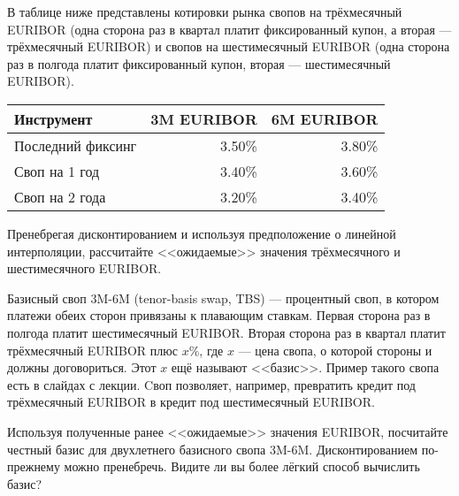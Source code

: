 \documentclass[a4paper,14pt]{extarticle}
\begin{document}
В таблице ниже представлены котировки рынка свопов на трёхмесячный EURIBOR (одна
сторона раз в квартал платит фиксированный купон, а вторая --- трёхмесячный 
EURIBOR) и свопов на шестимесячный EURIBOR (одна сторона раз в полгода платит 
фиксированный купон, вторая --- шестимесячный EURIBOR).

\begin{table}[h]
\centering
\begin{tabular}{l|r|r}
Инструмент         & 3M EURIBOR & 6M EURIBOR \\ \hline
Последний фиксинг  & 3.50\%     & 3.80\% \\
Своп на 1 год      & 3.40\%     & 3.60\% \\
Своп на 2 года     & 3.20\%     & 3.40\%
\end{tabular}
\end{table}

Пренебрегая дисконтированием и используя предположение о линейной интерполяции,
рассчитайте <<ожидаемые>> значения трёхмесячного и шестимесячного EURIBOR.

Базисный своп 3M-6M (tenor-basis swap, TBS) --- процентный своп, в котором 
платежи обеих сторон привязаны к плавающим ставкам. Первая сторона раз в 
полгода платит шестимесячный EURIBOR. Вторая сторона раз в квартал платит 
трёхмесячный EURIBOR плюс $x\%$, где $x$ --- цена свопа, о которой стороны и 
должны договориться. Этот $x$ ещё называют <<базис>>. Пример такого свопа есть в 
слайдах с лекции. Cвоп позволяет, например, превратить кредит под трёхмесячный 
EURIBOR в кредит под шестимесячный EURIBOR.

Используя полученные ранее <<ожидаемые>> значения EURIBOR, посчитайте честный
базис для двухлетнего базисного свопа 3M-6M. Дисконтированием по-прежнему можно
пренебречь. Видите ли вы более лёгкий способ вычислить базис?
\end{document}
